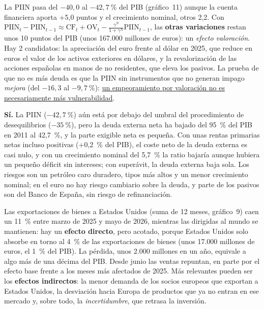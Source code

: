 \begin{examen}
La PIIN pasa del $-40{,}0$ al $-42{,}7~\%$ del PIB (gráfico~11) aunque la cuenta financiera aporta +5,0 puntos y el crecimiento nominal, otros 2,2. Con $\mathrm{PIIN}_t-\mathrm{PIIN}_{t-1}\approx\mathrm{CF}_t+\mathrm{OV}_t-\frac{\gamma^N}{1+\gamma^N}\mathrm{PIIN}_{t-1}$, las \textbf{otras variaciones} restan unos 10 puntos del PIB (unos 167.000 millones de euros): un \emph{efecto valoración}. Hay 2 candidatos: la apreciación del euro frente al dólar en 2025, que reduce en euros el valor de los activos exteriores en dólares, y la revalorización de las acciones españolas en manos de no residentes, que eleva los pasivos. La prueba de que no es más deuda es que la PIIN sin instrumentos que no generan impago \emph{mejora} (del $-16{,}3$ al $-9{,}7~\%$): \uline{un empeoramiento por valoración no es necesariamente más vulnerabilidad}.

\textbf{Sí.} La PIIN ($-42{,}7~\%$) aún está por debajo del umbral del procedimiento de desequilibrios ($-35~\%$), pero la deuda externa neta ha bajado del 95~\% del PIB en 2011 al 42,7~\%, y la parte exigible neta es pequeña. Con unas rentas primarias netas incluso positivas (+0,2~\% del PIB), el coste neto de la deuda externa es casi nulo, y con un crecimiento nominal del 5,7~\% la ratio bajaría aunque hubiera un pequeño déficit sin intereses; con superávit, la deuda externa baja sola. Los riesgos son un petróleo caro duradero, tipos más altos y un menor crecimiento nominal; en el euro no hay riesgo cambiario sobre la deuda, y parte de los pasivos son del Banco de España, sin riesgo de refinanciación.

Las exportaciones de bienes a Estados Unidos (suma de 12 meses, gráfico~9) caen un 11~\% entre marzo de 2025 y mayo de 2026, mientras las dirigidas al mundo se mantienen: hay un \textbf{efecto directo}, pero acotado, porque Estados Unidos solo absorbe en torno al 4~\% de las exportaciones de bienes (unos 17.000 millones de euros, el 1~\% del PIB). La pérdida, unos 2.000 millones en un año, equivale a algo más de una décima del PIB. Desde junio las ventas repuntan, en parte por el efecto base frente a los meses más afectados de 2025. Más relevantes pueden ser los \textbf{efectos indirectos}: la menor demanda de los socios europeos que exportan a Estados Unidos, la desviación hacia Europa de productos que ya no entran en ese mercado y, sobre todo, la \emph{incertidumbre}, que retrasa la inversión.


\end{examen}
